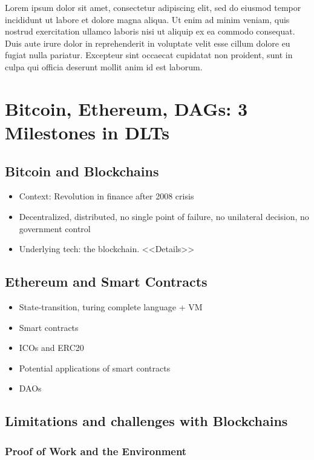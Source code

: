 \documentclass[a4paper]{article}
\begin{document}
Lorem ipsum dolor sit amet, consectetur adipiscing elit, sed do eiusmod tempor incididunt ut labore et dolore magna aliqua. Ut enim ad minim veniam, quis nostrud exercitation ullamco laboris nisi ut aliquip ex ea commodo consequat. Duis aute irure dolor in reprehenderit in voluptate velit esse cillum dolore eu fugiat nulla pariatur. Excepteur sint occaecat cupidatat non proident, sunt in culpa qui officia deserunt mollit anim id est laborum.

\newpage

\section{Bitcoin, Ethereum, DAGs: 3 Milestones in DLTs}

\subsection{Bitcoin and Blockchains}

\begin{itemize}
\item Context: Revolution in finance after 2008 crisis
\item Decentralized, distributed, no single point of failure, no unilateral decision, no government control
\item Underlying tech: the blockchain. <<Details>>
\end{itemize}

\subsection{Ethereum and Smart Contracts}

\begin{itemize}
\item State-transition, turing complete language + VM
\item Smart contracts
\item ICOs and ERC20
\item Potential applications of smart contracts 
\item DAOs 
\end{itemize}

\subsection{Limitations and challenges with Blockchains}

\subsubsection{Proof of Work and the Environment}
\end{document}
